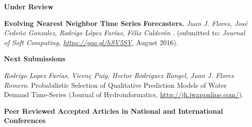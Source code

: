 \documentclass[10pt]{article}
\newenvironment{innerlist}[1][\enskip\textbullet]%
        {\begin{compactitem}[#1]}{\end{compactitem}}
\newcommand{\blankline}{\quad\pagebreak[2]}
\begin{document}
\textbf{Under Review}
\begin{innerlist}
\item \textbf{Evolving Nearest Neighbor Time Series Forecasters.} \textit{Juan J. Flores, José Cede\~no Gonzalez, Rodrigo López Farías, Félix Calderón }.   (submitted to: \textit{Journal of Soft Computing, \url{https://goo.gl/hSV5SV}}, August 2016).
\end{innerlist}



\textbf{Next Submissions}
\begin{innerlist}
\item \textit{Rodrigo Lopez Farías, Vicen\c{c} Puig, Hector Rodriguez Rangel, Juan J. Flores Romero}.  Probabilistic Selection of Qualitative Prediction Models of Water Demand Time-Series (Journal of Hydroinformatics, \url{http://jh.iwaponline.com/}).
\end{innerlist}

\blankline


\textbf{Peer Reviewed Accepted Articles in National and International Conferences}
\end{document}
